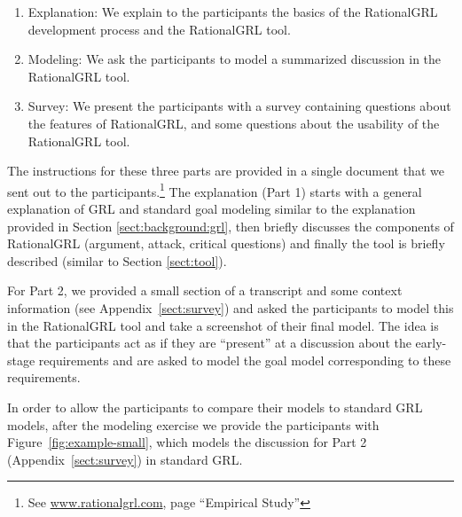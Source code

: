 \begin{enumerate}
\item Explanation: We explain to the participants the basics of the RationalGRL development process and the RationalGRL tool.
\item Modeling: We ask the participants to model a summarized discussion in the RationalGRL tool.
\item Survey: We present the participants with a survey containing questions about the features of RationalGRL, and some questions about the usability of the RationalGRL tool.
\end{enumerate}

The instructions for these three parts are provided in a single document that we sent out to the participants.\footnote{See \url{www.rationalgrl.com}, page ``Empirical Study''} The explanation (Part 1) starts with a general explanation of GRL and standard goal modeling similar to the explanation provided in Section \ref{sect:background:grl}, then briefly discusses the components of RationalGRL (argument, attack, critical questions) and finally the tool is briefly described (similar to Section \ref{sect:tool}). 

For Part 2, we provided a small section of a transcript and some context information (see Appendix~\ref{sect:survey}) and asked the participants to model this in the RationalGRL tool and take a screenshot of their final model. The idea is that the participants act as if they are ``present'' at a discussion about the early-stage requirements and are asked to model the goal model corresponding to these requirements. 

In order to allow the participants to compare their models to standard GRL models, after the modeling exercise we provide the participants with Figure~\ref{fig:example-small}, which models the discussion for Part 2 (Appendix~\ref{sect:survey}) in standard GRL.


